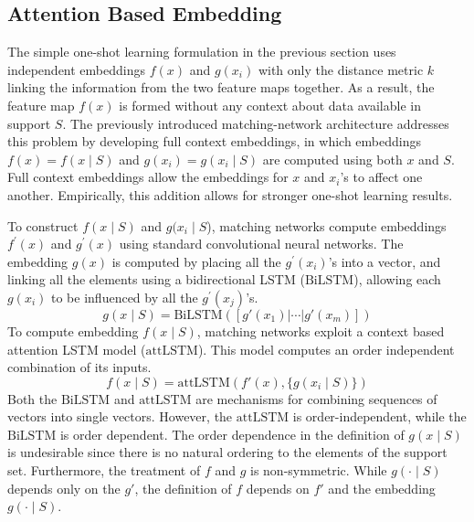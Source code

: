 \documentclass[journal=jacsat,manuscript=article]{achemso}
\begin{document}

\subsection{Attention Based Embedding}

The simple one-shot learning formulation in the previous section uses independent embeddings $f(x)$ and $g(x_i)$ with only the distance metric $k$ linking the information from the two feature maps together. As a result, the feature map $f(x)$ is formed without any context about data available in support $S$. The previously introduced matching-network architecture \cite{vinyals2016matching} addresses this problem by developing full context embeddings, in which embeddings $f(x)=f(x\mid S)$ and $g(x_i)=g(x_i\mid S)$ are computed using both $x$ and $S$. Full context embeddings allow the embeddings for $x$ and $x_i$'s to affect one another. Empirically, this addition allows for stronger one-shot learning results.

To construct $f(x\mid S)$ and $g(x_i\mid S$), matching networks\cite{vinyals2016matching} compute embeddings $f^\prime(x)$ and $g^\prime(x)$ using standard convolutional neural networks. The embedding $g(x)$ is computed by placing all the $g^\prime(x_i)$'s into a vector, and linking all the elements using a bidirectional LSTM \cite{hochreiter1997long, graves2013hybrid} ($\text{BiLSTM}$), allowing each $g(x_i)$ to be influenced by all the $g^\prime(x_j)$'s. 
\[
g(x\mid S) =\text{BiLSTM}([g'(x_1)|\cdots|g'(x_m)])
\]
To compute embedding $f(x\mid S)$, matching networks exploit a context based attention LSTM model \cite{vinyals2015order} ($\text{attLSTM}$). This model computes an order independent combination of its inputs.
\[
f(x\mid S) = \text{attLSTM}(f'(x), \{g(x_i\mid S)\})
\]
Both the $\text{BiLSTM}$ and $\text{attLSTM}$ are mechanisms for combining sequences of vectors into single vectors. However, the $\text{attLSTM}$ is order-independent, while the $\text{BiLSTM}$ is order dependent. The order dependence in the definition of $g(x\mid S)$ is undesirable since there is no natural ordering to the elements of the support set. Furthermore, the treatment of $f$ and $g$ is non-symmetric. While $g(\cdot \mid S)$ depends only on the $g'$, the definition of $f$ depends on $f'$ and the embedding $g(\cdot \mid S)$. %
\end{document}
